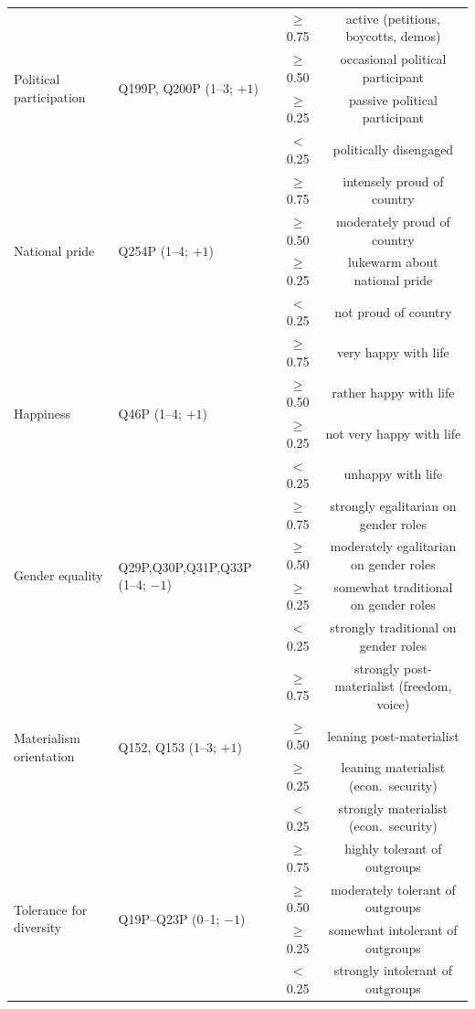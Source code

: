 \documentclass{article}
\begin{document}
\begin{table}[h]
\begin{tabular}{p{2.8cm}p{3.6cm}cc}
\multirow{4}{2.8cm}{Political participation}
 & \multirow{4}{3.6cm}{Q199P, Q200P (1--3; $+1$)}
 & $\geq$0.75 & active (petitions, boycotts, demos) \\
 & & $\geq$0.50 & occasional political participant \\
 & & $\geq$0.25 & passive political participant \\
 & & $<$0.25    & politically disengaged \\\midrule
\multirow{4}{2.8cm}{National pride}
 & \multirow{4}{3.6cm}{Q254P (1--4; $+1$)}
 & $\geq$0.75 & intensely proud of country \\
 & & $\geq$0.50 & moderately proud of country \\
 & & $\geq$0.25 & lukewarm about national pride \\
 & & $<$0.25    & not proud of country \\\midrule
\multirow{4}{2.8cm}{Happiness}
 & \multirow{4}{3.6cm}{Q46P (1--4; $+1$)}
 & $\geq$0.75 & very happy with life \\
 & & $\geq$0.50 & rather happy with life \\
 & & $\geq$0.25 & not very happy with life \\
 & & $<$0.25    & unhappy with life \\\midrule
\multirow{4}{2.8cm}{Gender equality}
 & \multirow{4}{3.6cm}{Q29P,Q30P,Q31P,Q33P (1--4; $-1$)}
 & $\geq$0.75 & strongly egalitarian on gender roles \\
 & & $\geq$0.50 & moderately egalitarian on gender roles \\
 & & $\geq$0.25 & somewhat traditional on gender roles \\
 & & $<$0.25    & strongly traditional on gender roles \\\midrule
\multirow{4}{2.8cm}{Materialism orientation}
 & \multirow{4}{3.6cm}{Q152, Q153 (1--3; $+1$)}
 & $\geq$0.75 & strongly post-materialist (freedom, voice) \\
 & & $\geq$0.50 & leaning post-materialist \\
 & & $\geq$0.25 & leaning materialist (econ.\ security) \\
 & & $<$0.25    & strongly materialist (econ.\ security) \\\midrule
\multirow{4}{2.8cm}{Tolerance for diversity}
 & \multirow{4}{3.6cm}{Q19P--Q23P (0--1; $-1$)}
 & $\geq$0.75 & highly tolerant of outgroups \\
 & & $\geq$0.50 & moderately tolerant of outgroups \\
 & & $\geq$0.25 & somewhat intolerant of outgroups \\
 & & $<$0.25    & strongly intolerant of outgroups \\\bottomrule
\end{tabular}
\end{table}
\end{document}
